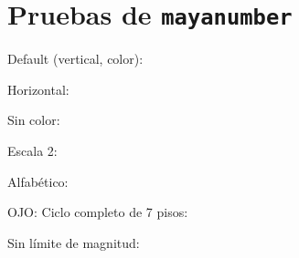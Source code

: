 \documentclass{article}
\begin{document}
\section*{Pruebas de \texttt{mayanumber}}
Default (vertical, color): \par
Horizontal: \par
Sin color: \par
Escala 2: \par
Alfabético:  \quad {}\par

OJO: Ciclo completo de 7 pisos: \par
Sin límite de magnitud: 
\end{document}
